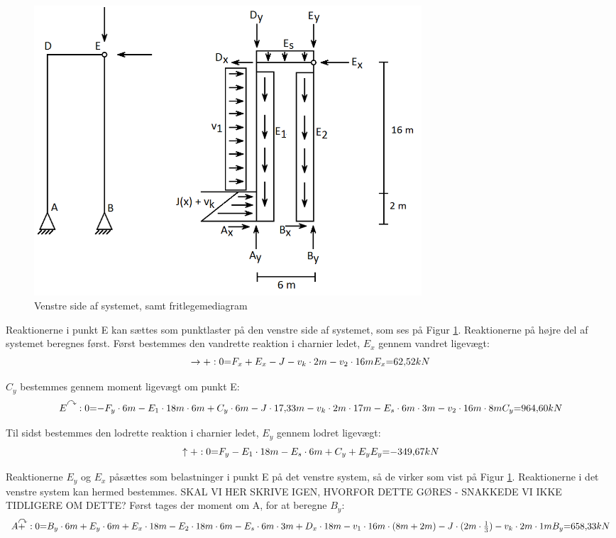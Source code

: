 \begin{figure}[H]
	\centering
	\includegraphics[width=0.7\textwidth]{billeder/venstre.png}
	\caption{Venstre side af systemet, samt fritlegemediagram}
	\label{fig:opdelingv}
\end{figure}

Reaktionerne i punkt E kan sættes som punktlaster på den venstre side af systemet, som ses på Figur \ref{fig:opdelingv}. Reaktionerne på højre del af systemet beregnes først.
\newline
\newline
Først bestemmes den vandrette reaktion i charnier ledet, $E_x$ gennem vandret ligevægt: 
\begin{equation}
	\rightarrow+:0 $=$ F_x + E_x - J - v_k \cdot 2m - v_2 \cdot 16m
	\\
	E_x $=$ 62,\!52 kN
\end{equation}

$C_y$ bestemmes gennem moment ligevægt om punkt E: 
\begin{equation}
	E\AR{}:0 $=$ -F_y \cdot 6m - E_1 \cdot 18m \cdot 6m + C_y \cdot 6m - J \cdot 17,\!33m - v_k \cdot 2m \cdot 17m - E_s \cdot 6m \cdot 3m - v_2 \cdot 16m \cdot 8m
	\\
	C_y $=$ 964,\!60 kN
\end{equation}

Til sidst bestemmes den lodrette reaktion i charnier ledet, $E_y$ gennem lodret ligevægt: 
\begin{equation}
	\uparrow+: 0 $=$ F_y - E_1 \cdot 18m - E_s \cdot 6m + C_y + E_y
	\\	
	E_y $=$ -349,\!67 kN
\end{equation}

Reaktionerne $E_y$ og $E_x$ påsættes som belastninger i punkt E på det venstre system, så de virker som vist på Figur \ref{fig:opdelingv}. Reaktionerne i det venstre system kan hermed bestemmes.  SKAL VI HER SKRIVE IGEN, HVORFOR DETTE GØRES - SNAKKEDE VI IKKE TIDLIGERE OM DETTE?
\newline
\newline
Først tages der moment om A, for at beregne $B_y$:
\begin{equation}
	A\AR+: 0 $=$ B_y \cdot 6m + E_y \cdot 6m + E_x \cdot 18m - E_2 \cdot 18m \cdot 6m - E_s \cdot 6m \cdot 3m + D_x \cdot 18m - v_1 \cdot 16m \cdot (8m + 2m) - J \cdot (2m \cdot \frac{1}{3}) - v_k \cdot 2m \cdot 1m
	\\ 
	B_y $=$ 658,\!33 kN
\end{equation}

